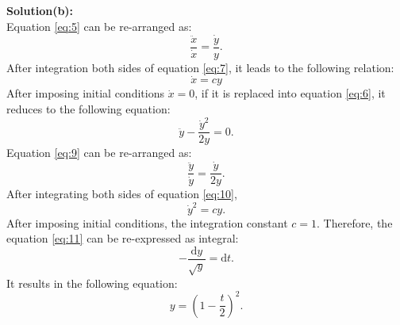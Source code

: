 \documentclass[11pt]{amsart}
\begin{document}
\\
\\
\textbf{Solution(b):}\\
Equation \ref{eq:5} can be re-arranged as:
\begin{equation}
\label{eq:7}
\frac{\ddot{x}}{\dot{x}}=\frac{\dot{y}}{y}.
\end{equation}
After integration both sides of equation \ref{eq:7}, it leads to the following relation:
\begin{equation}
\label{eq:8}
\dot{x}=cy
\end{equation}
After imposing initial conditions $\dot{x}=0$, if it is replaced into equation \ref{eq:6}, it reduces to the following equation:
\begin{equation}
\label{eq:9}
\ddot{y}-\frac{\dot{y}^2}{2y}=0.
\end{equation}
Equation \ref{eq:9} can be re-arranged as:
\begin{equation}
\label{eq:10}
\frac{\ddot{y}}{\dot{y}}=\frac{\dot{y}}{2y}.
\end{equation}
After integrating both sides of equation \ref{eq:10}, 
\begin{equation}
\label{eq:11}
\dot{y}^2=c y.
\end{equation}
After imposing initial conditions, the integration constant $c=1$. Therefore, the equation \ref{eq:11} can be re-expressed as integral:
\begin{equation}
\label{eq:12}
-\frac{\mathrm{d}y}{\sqrt{y}}=\mathrm{d}t.
\end{equation}
It results in the following equation:
\begin{equation}
\label{eq:13}
y=(1-\frac{t}{2})^2.
\end{equation}
\end{document}
